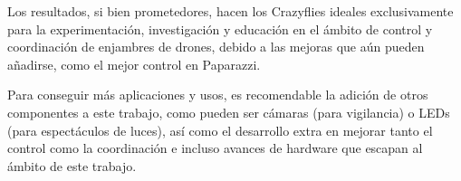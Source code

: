 Los resultados, si bien prometedores, hacen los Crazyflies ideales exclusivamente para la experimentación, investigación y educación 
en el ámbito de control y coordinación de enjambres de drones, debido a las mejoras que aún pueden añadirse, como el mejor control en Paparazzi.

Para conseguir más aplicaciones y usos, es recomendable la adición de otros componentes a este trabajo, 
como pueden ser cámaras (para vigilancia) o LEDs (para espectáculos de luces), 
así como el desarrollo extra en mejorar tanto el control como la coordinación e 
incluso avances de hardware que escapan al ámbito de este trabajo.